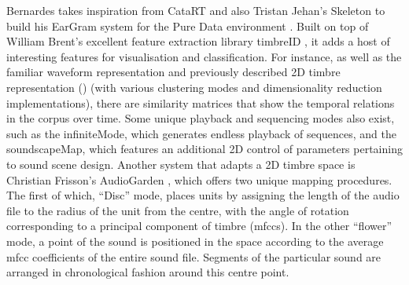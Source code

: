 Bernardes takes inspiration from CataRT and also Tristan Jehan’s Skeleton \citep{Jehan2005} to build his EarGram system for the Pure Data environment \citep{Bernardes2013}. Built on top of William Brent’s excellent feature extraction library timbreID \citep{Brent2010}, it adds a host of interesting features for visualisation and classification.  For instance, as well as the familiar waveform representation and previously described 2D timbre representation () (with various clustering modes and dimensionality reduction implementations), there are similarity matrices that show the temporal relations in the corpus over time. Some unique playback and sequencing modes also exist, such as the infiniteMode, which generates endless playback of sequences, and the soundscapeMap, which features an additional 2D control of parameters pertaining to sound scene design. Another system that adapts a 2D timbre space is Christian Frisson’s AudioGarden \citep{Frisson2010}, which offers two unique mapping procedures. The first of which, “Disc” mode, places units by assigning the length of the audio file to the radius of the unit from the centre, with the angle of rotation corresponding to a principal component of timbre (\acrshort{mfcc}s).  In the other “flower” mode, a point of the sound is positioned in the space according to the average \acrshort{mfcc} coefficients of the entire sound file. Segments of the particular sound are arranged in chronological fashion around this centre point.

